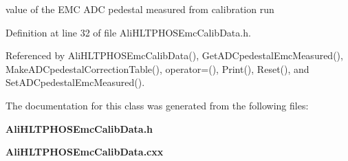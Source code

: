 value of the EMC ADC pedestal measured from calibration run 

Definition at line 32 of file Ali\-HLTPHOSEmc\-Calib\-Data.h.

Referenced by Ali\-HLTPHOSEmc\-Calib\-Data(), Get\-ADCpedestal\-Emc\-Measured(), Make\-ADCpedestal\-Correction\-Table(), operator=(), Print(), Reset(), and Set\-ADCpedestal\-Emc\-Measured().

The documentation for this class was generated from the following files:\begin{CompactItemize}
\item 
{\bf Ali\-HLTPHOSEmc\-Calib\-Data.h}\item 
{\bf Ali\-HLTPHOSEmc\-Calib\-Data.cxx}\end{CompactItemize}
